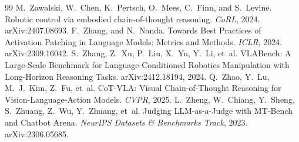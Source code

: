 \begin{thebibliography}{99}
 M.~Zawalski, W.~Chen, K.~Pertsch, O.~Mees, C.~Finn, and S.~Levine. Robotic control via embodied chain-of-thought reasoning. \emph{CoRL}, 2024. arXiv:2407.08693.
 F.~Zhang, and N.~Nanda. Towards Best Practices of Activation Patching in Language Models: Metrics and Methods. \emph{ICLR}, 2024. arXiv:2309.16042.
 S.~Zhang, Z.~Xu, P.~Liu, X.~Yu, Y.~Li, et~al. {VLABench}: A Large-Scale Benchmark for Language-Conditioned Robotics Manipulation with Long-Horizon Reasoning Tasks. arXiv:2412.18194, 2024.
 Q.~Zhao, Y.~Lu, M.~J.~Kim, Z.~Fu, et~al. {CoT-VLA}: Visual Chain-of-Thought Reasoning for Vision-Language-Action Models. \emph{CVPR}, 2025.
 L.~Zheng, W.~Chiang, Y.~Sheng, S.~Zhuang, Z.~Wu, Y.~Zhuang, et~al. Judging LLM-as-a-Judge with MT-Bench and Chatbot Arena. \emph{NeurIPS Datasets \& Benchmarks Track}, 2023. arXiv:2306.05685.
\end{thebibliography}
